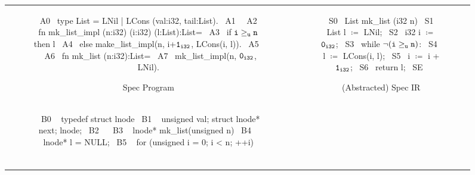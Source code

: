 \begin{figure}[H]
\begin{tabular}{cc}
\begin{subfigure}[b]{0.565\textwidth}
\begin{center}
\begin{allLangEnvScript}
~{\tiny \textcolor{mygray}{A0}}~ type List = LNil | LCons (val:i32, tail:List).
~{\tiny \textcolor{mygray}{A1}}~
~{\tiny \textcolor{mygray}{A2}}~ fn mk_list_impl (n:i32) (i:i32) (l:List):List=
~{\tiny \textcolor{mygray}{A3}}~    if ${\tt i \geq_u n}$ then l
~{\tiny \textcolor{mygray}{A4}}~    else make_list_impl(n, i+${\tt 1_{i32}}$, LCons(i, l)).
~{\tiny \textcolor{mygray}{A5}}~
~{\tiny \textcolor{mygray}{A6}}~ fn mk_list (n:i32):List=
~{\tiny \textcolor{mygray}{A7}}~    mk_list_impl(n, ${\tt 0_{i32}}$, LNil).
\end{allLangEnvScript}
\end{center}
\caption{\label{fig:llAllocSpec}Spec Program}
\end{subfigure}%
&
\begin{subfigure}[b]{0.435\textwidth}
\begin{center}
\begin{allLangEnvScript}
~{\tiny \textcolor{mygray}{S0}}~ List mk_list (i32 n) {
~{\tiny \textcolor{mygray}{S1}}~   List l $\coloneqq$ LNil;
~{\tiny \textcolor{mygray}{S2}}~   i32  i $\coloneqq$ ${\tt 0_{i32}}$;
~{\tiny \textcolor{mygray}{S3}}~   while $\mathrm{\tt \neg (i \geq_{u} n)}$:
~{\tiny \textcolor{mygray}{S4}}~     l $\coloneqq$ LCons(i, l);
~{\tiny \textcolor{mygray}{S5}}~     i $\coloneqq$ i + ${\tt 1_{i32}}$;
~{\tiny \textcolor{mygray}{S6}}~   return l;
~{\tiny \textcolor{mygray}{SE}}~ }
\end{allLangEnvScript}
\end{center}
\caption{\label{fig:llAllocSpecIR}(Abstracted) Spec IR}
\end{subfigure}%
\\
\begin{subfigure}[b]{0.565\textwidth}
\begin{center}
\begin{allLangEnvScript}
~{\tiny \textcolor{mygray}{B0 }}~ typedef struct lnode {
~{\tiny \textcolor{mygray}{B1 }}~   unsigned val; struct lnode* next; } lnode;
~{\tiny \textcolor{mygray}{B2 }}~ 
~{\tiny \textcolor{mygray}{B3 }}~ lnode* mk_list(unsigned n) {
~{\tiny \textcolor{mygray}{B4 }}~   lnode* l = NULL;
~{\tiny \textcolor{mygray}{B5 }}~   for (unsigned i = 0; i < n; ++i) {                       $\phantom{m \coloneqq \mathrm{\tt m[ \&\structPointer{\tt p}{m}{\tt lnode}{val} \leftarrow i]_{i32}};}$
}}
\end{allLangEnvScript}
\end{center}
\end{subfigure}
\end{tabular}
\end{figure}
